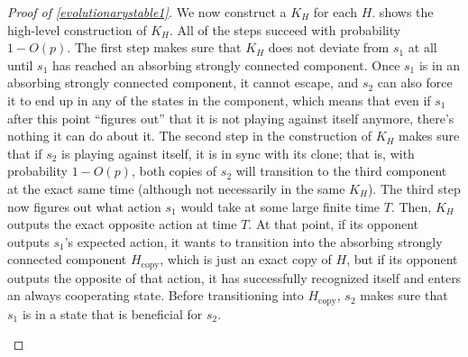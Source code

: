 \documentclass[12pt]{article}
\theoremstyle{definition}
\theoremstyle{remark}
\begin{document}
\begin{proof}[Proof of \cref{evolutionarystable1}]
      We now construct a $K_H$ for each $H$.  shows the high-level construction of $K_H$.
       All of the steps succeed with probability $1 - O(p)$. The first step makes sure that $K_H$ does not deviate from $s_1$ at all
        until $s_1$ has reached an absorbing strongly connected component. 
       Once $s_1$ is in an absorbing strongly connected component, it cannot escape, and $s_2$ can also force it to end up in any of the states in the component, which means that even if $s_1$ after this point ``figures out'' that it is not playing against itself anymore, there's nothing it can do about it.
      The second step in the construction of $K_H$ makes sure that if $s_2$ is playing against itself, it is in sync with its clone; that is, with probability $1 - O(p)$, both copies of $s_2$ will transition to the third component at the exact same time (although not necessarily in the same $K_H$). 
      The third step now figures out what action $s_1$ would take at some large finite time $T$. 
      Then, $K_H$ outputs the exact opposite action at time $T$. 
      At that point, if its opponent outputs $s_1$'s expected action, it wants to transition into the absorbing strongly connected component $H_\text{copy}$, which is just an exact copy of $H$, but if its opponent outputs the opposite of that action, it has successfully recognized itself and enters an always cooperating state.
      Before transitioning into $H_\text{copy}$, $s_2$ makes sure that $s_1$ is in a state that is beneficial for $s_2$.

      \begin{figure}
        \centering
\end{figure}
\end{proof}
\end{document}
